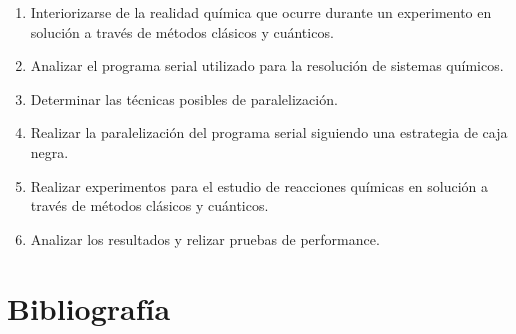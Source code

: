 \documentclass[a4paper, 12pt]{article}
\begin{document}
\begin{enumerate}
\item Interiorizarse de la realidad qu\'imica que ocurre durante un experimento en soluci\'on a trav\'es de m\'etodos cl\'asicos y cu\'anticos.

\item Analizar el programa serial utilizado para la resoluci\'on de sistemas qu\'imicos.

\item Determinar las t\'ecnicas posibles de paralelizaci\'on.

\item Realizar la paralelizaci\'on del programa serial siguiendo una estrategia de caja negra.

\item Realizar experimentos para el estudio de reacciones qu\'imicas en soluci\'on a trav\'es de m\'etodos cl\'asicos y cu\'anticos.

\item Analizar los resultados y relizar pruebas de performance.

\end{enumerate}

\section*{Bibliograf\'ia}
\end{document}
